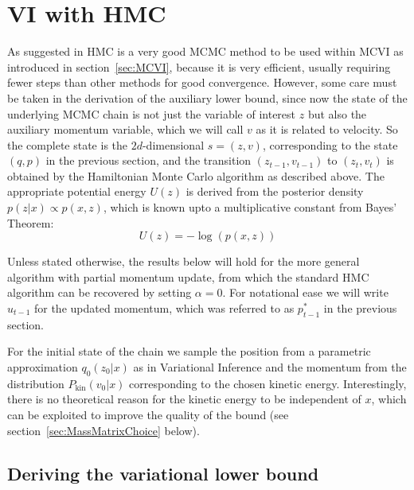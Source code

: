 \section{VI with HMC}
\label{sec:HMCVI}
As suggested in \parencite{Salimans2014} HMC is a very good MCMC method to be used within MCVI as introduced in section~\ref{sec:MCVI}, because it is very efficient, usually requiring fewer steps than other methods for good convergence. However, some care must be taken in the derivation of the auxiliary lower bound, since now the state of the underlying MCMC chain is not just the variable of interest $z$ but also the auxiliary momentum variable, which we will call $v$ as it is related to velocity. So the complete state is the $2d$-dimensional $s=(z, v)$, corresponding to the state $(q, p)$ in the previous section, and the transition $(z_{t-1}, v_{t-1})$ to $(z_t, v_t)$ is obtained by the Hamiltonian Monte Carlo algorithm as described above. The appropriate potential energy $U(z)$ is derived from the posterior density $p(z|x) \propto p(x, z)$, which is known upto a multiplicative constant from Bayes' Theorem:
\begin{equation} \label{eq:VIwithHMCPotEnergy}
U(z) = -\log(p(x, z))
\end{equation}

Unless stated otherwise, the results below will hold for the more general algorithm with partial momentum update, from which the standard HMC algorithm can be recovered by setting $\alpha = 0$. For notational ease we will write $u_{t-1}$ for the updated momentum, which was referred to as $p^*_{t-1}$ in the previous section.

\label{sec:KinEnergyMayDependOnX}
For the initial state of the chain we sample the position from a parametric approximation $q_0(z_0|x)$ as in Variational Inference and the momentum from the distribution $P_\textrm{kin}(v_0|x)$ corresponding to the chosen kinetic energy. Interestingly, there is no theoretical reason for the kinetic energy to be independent of $x$, which can be exploited to improve the quality of the bound (see section~\ref{sec:MassMatrixChoice} below).

\subsection{Deriving the variational lower bound}

